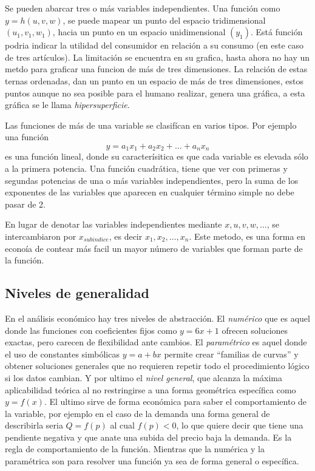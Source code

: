 Se pueden abarcar tres o más variables independientes. Una función como \(y=h(u,v,w)\), se puede mapear un punto del espacio tridimensional \((u_1, v_1, w_1)\), hacia un punto en un espacio unidimensional \((y_1)\). Está función podria indicar la utilidad del consumidor en relación a su consumo (en este caso de tres artículos).
La limitación se encuentra en su grafica, hasta ahora no hay un metdo para graficar una funcion de más de tres dimensiones.
La relación de estas ternas ordenadas, dan un punto en un espacio de más de tres dimensiones, estos puntos aunque no sea posible para el humano realizar, genera una gráfica, a esta gráfica se le llama \textit{hipersuperficie}.

Las funciones de más de una variable se clasifícan en varios tipos. Por ejemplo una función 
\[
y=a_1x_1+a_2x_2+\dots+a_nx_n
\]
es una función lineal, donde su caracterísitica es que cada variable es elevada sólo a la primera potencia.
Una función cuadrática, tiene que ver con primeras y segundas potencias de una o más variables independientes, pero la suma de los exponentes de las variables que aparecen en cualquier término simple no debe pasar de 2.

\begin{nota}
    En lugar de denotar las variables independientes mediante \(x,u,v,w, \dots\), se intercambiaron por \(x_{subindice}\), es decir \(x_1, x_2, \dots, x_n\).
    Este metodo, es una forma en econoía de contear más facil un mayor número de variables que forman parte de la función.
\end{nota}

\subsection{Niveles de generalidad}

En el análisis económico hay tres niveles de abstracción. El \textit{numérico} que es aquel donde las funciones con coeficientes fijos como \(y=6x+1\) ofrecen soluciones exactas, pero carecen de flexibilidad ante cambios.
El \textit{paramétrico} es aquel donde el uso de constantes simbólicas \(y=a+bx\) permite crear ``familias de curvas'' y obtener soluciones generales que no requieren repetir todo el procedimiento lógico si los datos cambian.
Y por ultimo el \textit{nivel general}, que alcanza la máxima aplicabilidad teórica al no restringirse a una forma geométrica específica como \(y=f(x)\). El ultimo sirve de forma económica para saber el comportamiento de la variable, por ejemplo en el caso de la demanda una forma general de describirla seria \(Q=f(p)\) al cual \(f(p)<0\), lo que quiere decir que tiene una pendiente negativa y que anate una subida del precio baja la demanda. Es la regla de comportamiento de la función. Mientras que la numérica y la paramétrica son para resolver una función ya sea de forma general o específica.

